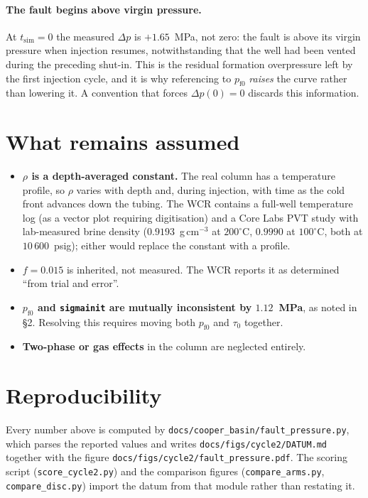 \documentclass[11pt]{article}
\newcommand{\code}[1]{\texttt{#1}}
\newcommand{\pfz}{p_{\mathrm{f}0}}
\begin{document}
\paragraph{The fault begins above virgin pressure.}
At $t_{\mathrm{sim}} = 0$ the measured $\Delta p$ is $+1.65$~MPa, not zero: the
fault is above its virgin pressure when injection resumes, notwithstanding that
the well had been vented during the preceding shut-in. This is the residual
formation overpressure left by the first injection cycle, and it is why
referencing to $\pfz$ \emph{raises} the curve rather than lowering it. A
convention that forces $\Delta p(0) = 0$ discards this information.

\section{What remains assumed}

\begin{itemize}
\item \textbf{$\rho$ is a depth-averaged constant.} The real column has a
      temperature profile, so $\rho$ varies with depth and, during injection,
      with time as the cold front advances down the tubing. The WCR contains a
      full-well temperature log (as a vector plot requiring digitisation) and a
      Core Labs PVT study with lab-measured brine density
      ($0.9193$~g\,cm$^{-3}$ at $200^\circ$C, $0.9990$ at $100^\circ$C, both at
      $10\,600$~psig); either would replace the constant with a profile.
\item \textbf{$f = 0.015$} is inherited, not measured. The WCR reports it as
      determined ``from trial and error''.
\item \textbf{$\pfz$ and \code{sigmainit} are mutually inconsistent by
      $1.12$~MPa}, as noted in \S2. Resolving this requires moving both
      $\pfz$ and $\tau_0$ together.
\item \textbf{Two-phase or gas effects} in the column are neglected entirely.
\end{itemize}

\section*{Reproducibility}

Every number above is computed by
\code{docs/cooper\_basin/fault\_pressure.py}, which parses the reported values
and writes \code{docs/figs/cycle2/DATUM.md} together with the figure
\code{docs/figs/cycle2/fault\_pressure.pdf}. The scoring script
(\code{score\_cycle2.py}) and the comparison figures
(\code{compare\_arms.py}, \code{compare\_disc.py}) import the datum from that
module rather than restating it.
\end{document}
